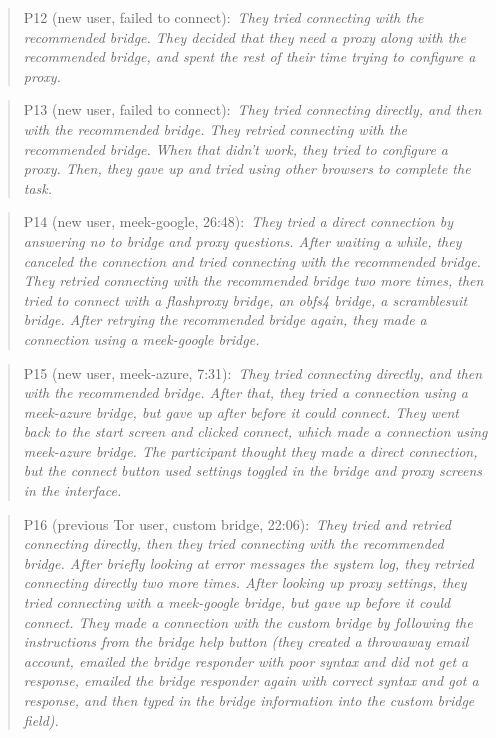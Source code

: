 \documentclass[USenglish,oneside,twocolumn]{article}
\newcommand{\pquote}[2]{
\begin{quotation}
\noindent #1:~\textit{#2}
\end{quotation}
}
\begin{document}
\pquote{P12 (new user, failed to connect)}{They tried connecting with the recommended bridge. They decided that they need a proxy along with the recommended bridge, and spent the rest of their time trying to configure a proxy.}

\pquote{P13 (new user, failed to connect)}{They tried connecting directly, and then with the recommended bridge. They retried connecting with the recommended bridge. When that didn't work, they tried to configure a proxy. Then, they gave up and tried using other browsers to complete the task.}

\pquote{P14 (new user, meek-google, 26:48)}{They tried a direct connection by answering no to bridge and proxy questions. After waiting a while, they canceled the connection and tried connecting with the recommended bridge. They retried connecting with the recommended bridge two more times, then tried to connect with a flashproxy bridge, an obfs4 bridge, a scramblesuit bridge. After retrying the recommended bridge again, they made a connection using a meek-google bridge.}

\pquote{P15 (new user, meek-azure, 7:31)}{They tried connecting directly, and then with the recommended bridge. After that, they tried a connection using a meek-azure bridge, but gave up after before it could connect. They went back to the start screen and clicked connect, which made a connection using meek-azure bridge. The participant thought they made a direct connection, but the connect button used settings toggled in the bridge and proxy screens in the interface.}

\pquote{P16 (previous Tor user, custom bridge, 22:06)}{They tried and retried connecting directly, then they tried connecting with the recommended bridge. After briefly looking at error messages the system log, they retried connecting directly two more times. After looking up proxy settings, they tried connecting with a meek-google bridge, but gave up before it could connect. They made a connection with the custom bridge by following the instructions from the bridge help button (they created a throwaway email account, emailed the bridge responder with poor syntax and did not get a response, emailed the bridge responder again with correct syntax and got a response, and then typed in the bridge information into the custom bridge field).}
\end{document}
